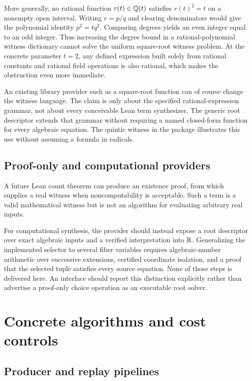 More generally, no rational function $r(t)\in\mathbb Q(t)$ satisfies $r(t)^2=t$ on a nonempty open interval. Writing $r=p/q$ and clearing denominators would give the polynomial identity $p^2=tq^2$. Comparing degrees yields an even integer equal to an odd integer. Thus increasing the degree bound in a rational-polynomial witness dictionary cannot solve the uniform square-root witness problem. At the concrete parameter $t=2$, any defined expression built solely from rational constants and rational field operations is also rational, which makes the obstruction even more immediate.

An existing library provider such as a square-root function can of course change the witness language. The claim is only about the specified rational-expression grammar, not about every conceivable Lean term synthesizer. The generic root descriptor extends that grammar without requiring a named closed-form function for every algebraic equation. The quintic witness in the package illustrates this use without assuming a formula in radicals.

\subsection{Proof-only and computational providers}

A future Lean count theorem can produce an existence proof, from which  supplies a real witness when noncomputability is acceptable. Such a term is a valid mathematical witness but is not an algorithm for evaluating arbitrary real inputs.

For computational synthesis, the provider should instead expose a root descriptor over exact algebraic inputs and a verified interpretation into $\mathbb R$. Generalizing the implemented selector to several fiber variables requires algebraic-number arithmetic over successive extensions, certified coordinate isolation, and a proof that the selected tuple satisfies every source equation. None of those steps is delivered here. An interface should report this distinction explicitly rather than advertise a proof-only choice operation as an executable root solver.

\section{Concrete algorithms and cost controls}\label{sec:algorithms}

\subsection{Producer and replay pipelines}

